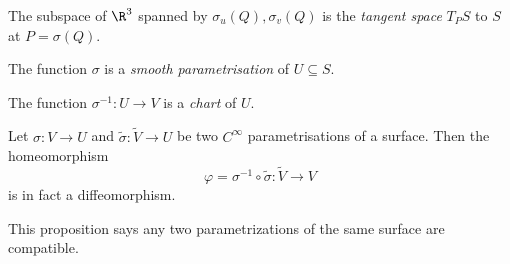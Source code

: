 \documentclass[a4paper]{article}
\begin{document}
\begin{defi}
  The subspace of $\R^3$ spanned by $\sigma_u(Q), \sigma_v(Q)$ is the
  \emph{tangent space} $T_PS$ to $S$ at $P = \sigma(Q)$.
\end{defi}

\begin{defi}
  The function $\sigma$ is a \emph{smooth parametrisation} of $U \subseteq S$.
\end{defi}

\begin{defi}[Chart]
  The function $\sigma^{-1}: U \to V$ is a \emph{chart} of $U$.
\end{defi}

\begin{prop}
  Let $\sigma: V \to U$ and $\tilde{\sigma}: \tilde{V} \to U$ be two $C^\infty$ parametrisations of a surface. Then the homeomorphism
  \[
    \varphi = \sigma^{-1} \circ \tilde{\sigma}: \tilde{V} \to V
  \]
  is in fact a diffeomorphism.
\end{prop}
This proposition says any two parametrizations of the same surface are compatible.
\end{document}
